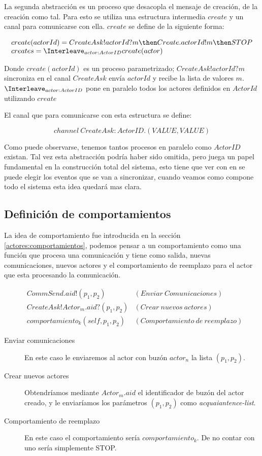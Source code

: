 La segunda abstracción es un proceso que desacopla el mensaje de creación, de la creación como tal. Para esto se utiliza una estructura intermedia $create$ y un canal para comunicarse con ella. $create$ se define de la siguiente forma: 

\[
\begin{array}{l}
create(actorId) = CreateAsk!actorId?m \then Create.actorId!m \then STOP \\
creates = \Interleave_{actor : ActorID} create(actor)
\end{array}
\]

Donde $create(actorId)$ es un proceso parametrizado; $CreateAsk!actorId?m$ sincroniza en el canal $CreateAsk$ envía $actorId$ y recibe la lista de valores $m$. $\Interleave_{actor : ActorID}$ pone en paralelo todos los actores definidos en $ActorId$ utilizando $create$

El canal que para comunicarse con esta estructura se define:

\[
channel\ CreateAsk:ActorID.(VALUE, VALUE)
\]

Como puede observarse, tenemos tantos procesos en paralelo como $ActorID$ existan. Tal vez esta abstracción podría haber sido omitida, pero juega un papel fundamental en la construcción total del sistema, esto tiene que ver con en \CSP se puede elegir los eventos \cite[chap.~2,p.~55]{Roscoe:1997:TPC:550448} que se van a sincronizar, cuando veamos como compone todo el sistema esta idea quedará mas clara.

\subsection{Definición de comportamientos}
La idea de comportamiento fue introducida en la sección \ref{actores:comportamientos}, podemos pensar a un comportamiento como una función que procesa una comunicación y tiene como salida, nuevas comunicaciones, nuevos actores y el comportamiento de reemplazo para el actor que esta procesando la comunicación.

\begin{align*}
&CommSend.aid!(p_1, p_2) & (Enviar\ Comunicaciones) \\ 
&CreateAsk!Actor_m.aid?(p_1, p_2) & (Crear\ nuevos\ actores)\\
&comportamiento_k(self, p_1, p_2)  & (Comportamiento\ de\ reemplazo)
\end{align*}

\begin{description}
\item [Enviar comunicaciones] En este caso le enviaremos al actor con buzón $actor_n$ la lista $(p_1, p_2)$. 
\item [Crear nuevos actores] Obtendríamos mediante $Actor_m.aid$ el identificador de buzón del actor creado, y le enviaríamos los parámetros $(p_1, p_2)$ como \textit{acquaiantence-list}.
\item [Comportamiento de reemplazo] En este caso el comportamiento sería $comportamiento_k$. De no contar con uno sería simplemente STOP.
\end{description}

